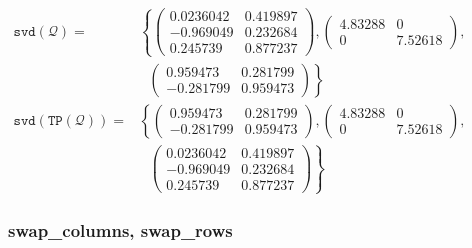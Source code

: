 \begin{description}
  \(\begin{aligned}
     \mathtt{svd(\mathcal{Q})} = &
       \left\{
         \begin{pmatrix} 0.0236042 & 0.419897 \\ -0.969049 & 0.232684 \\ 0.245739 & 0.877237 \end{pmatrix},
         \begin{pmatrix}  4.83288 & 0 \\ 0 & 7.52618 \end{pmatrix}, \right.  \\
         & \left. \: \; \,
           \begin{pmatrix} 0.959473 & 0.281799 \\ - 0.281799 & 0.959473 \end{pmatrix}
       \right\} \\[2mm]
      \mathtt{svd(TP(\mathcal{Q}))} = &
       \left\{
         \begin{pmatrix} 0.959473 & 0.281799 \\ - 0.281799 & 0.959473 \end{pmatrix},
         \begin{pmatrix}  4.83288 & 0 \\ 0 & 7.52618 \end{pmatrix}, \right.  \\
         & \left. \: \; \,
         \begin{pmatrix} 0.0236042 & 0.419897 \\ -0.969049 & 0.232684 \\ 0.245739 & 0.877237 \end{pmatrix}
       \right\}
    \end{aligned}\)
\end{description}


\subsubsection{swap\_columns, swap\_rows}
\label{linalg:swap_columns}
\hypertarget{operator:SWAP_COLUMNS}{}

